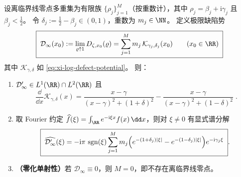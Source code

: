 \begin{theorem}\label{thm:xi-limit-defect-potential-fourier-injective}
设离临界线零点多重集为有限族 \(\{\rho_j\}_{j=1}^{M}\)（按重数计），其中
\(
\rho_j=\beta_j+\mathrm{i}\gamma_j
\)
且 \(\beta_j<\tfrac12\)。
令 \(\delta_j:=\tfrac12-\beta_j\in(0,1)\)，重数为 \(m_j\in\NN\)。
定义极限缺陷势
\begin{equation}\label{eq:xi-limit-defect-potential}
\boxed{\;
\mathcal{D}_\infty(x_0)
:=\lim_{\varrho\uparrow 1}D_{\zeta,x_0}(\varrho)
=\sum_{j=1}^{M} m_j\,\mathcal{K}_{\gamma_j,\delta_j}(x_0)\qquad(x_0\in\RR)\;}
\end{equation}
其中 \(\mathcal{K}_{\gamma,\delta}\) 如 \eqref{eq:xi-log-defect-potential}。
则：
\begin{enumerate}
  \item \(\mathcal{D}_\infty'\in L^1(\RR)\cap L^2(\RR)\) 且
  \begin{equation}\label{eq:xi-log-defect-potential-derivative}
  \boxed{\;
  \frac{\dd}{\dd x}\mathcal{K}_{\gamma,\delta}(x)
  =\frac{x-\gamma}{(x-\gamma)^2+(1+\delta)^2}-\frac{x-\gamma}{(x-\gamma)^2+(1-\delta)^2}\; }.
  \end{equation}
  \item 取 Fourier 约定 \(\widehat f(\xi)=\int_{\RR}e^{-\mathrm{i}\xi x}f(x)\,\dd x\)，则对 \(\xi\neq 0\) 有显式谱分解
  \begin{equation}\label{eq:xi-limit-defect-potential-fourier}
  \boxed{\;
  \widehat{\mathcal{D}_\infty'}(\xi)
  =-\mathrm{i}\pi\,\operatorname{sgn}(\xi)\sum_{j=1}^{M} m_j\Bigl(e^{-(1+\delta_j)|\xi|}-e^{-(1-\delta_j)|\xi|}\Bigr)e^{-\mathrm{i}\gamma_j\xi}\; }.
  \end{equation}
  \item \textbf{（零化单射性）}若 \(\mathcal{D}_\infty\equiv 0\)，则 \(M=0\)，即不存在离临界线零点。
\end{enumerate}
\end{theorem}

